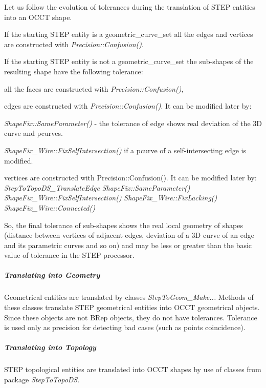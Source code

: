Let us follow the evolution of tolerances during the translation of S\+T\+EP entities into an O\+C\+CT shape.

If the starting S\+T\+EP entity is a geometric\+\_\+curve\+\_\+set all the edges and vertices are constructed with {\itshape Precision\+::\+Confusion()}.

If the starting S\+T\+EP entity is not a geometric\+\_\+curve\+\_\+set the sub-\/shapes of the resulting shape have the following tolerance\+:
\begin{DoxyItemize}
\item all the faces are constructed with {\itshape Precision\+::\+Confusion()},
\item edges are constructed with {\itshape Precision\+::\+Confusion()}. It can be modified later by\+:
\item {\itshape Shape\+Fix\+::\+Same\+Parameter()} -\/ the tolerance of edge shows real deviation of the 3D curve and pcurves.
\item {\itshape Shape\+Fix\+\_\+\+Wire\+::\+Fix\+Self\+Intersection()} if a pcurve of a self-\/intersecting edge is modified.
\item vertices are constructed with Precision\+::\+Confusion(). It can be modified later by\+: {\itshape Step\+To\+Topo\+D\+S\+\_\+\+Translate\+Edge} {\itshape Shape\+Fix\+::\+Same\+Parameter()} {\itshape Shape\+Fix\+\_\+\+Wire\+::\+Fix\+Self\+Intersection()} {\itshape Shape\+Fix\+\_\+\+Wire\+::\+Fix\+Lacking()} {\itshape Shape\+Fix\+\_\+\+Wire\+::\+Connected()}
\end{DoxyItemize}

So, the final tolerance of sub-\/shapes shows the real local geometry of shapes (distance between vertices of adjacent edges, deviation of a 3D curve of an edge and its parametric curves and so on) and may be less or greater than the basic value of tolerance in the S\+T\+EP processor.

\subparagraph*{Translating into Geometry}

Geometrical entities are translated by classes {\itshape Step\+To\+Geom\+\_\+\+Make...} Methods of these classes translate S\+T\+EP geometrical entities into O\+C\+CT geometrical objects. Since these objects are not B\+Rep objects, they do not have tolerances. Tolerance is used only as precision for detecting bad cases (such as points coincidence).

\subparagraph*{Translating into Topology}

S\+T\+EP topological entities are translated into O\+C\+CT shapes by use of classes from package {\itshape Step\+To\+Topo\+DS}.

